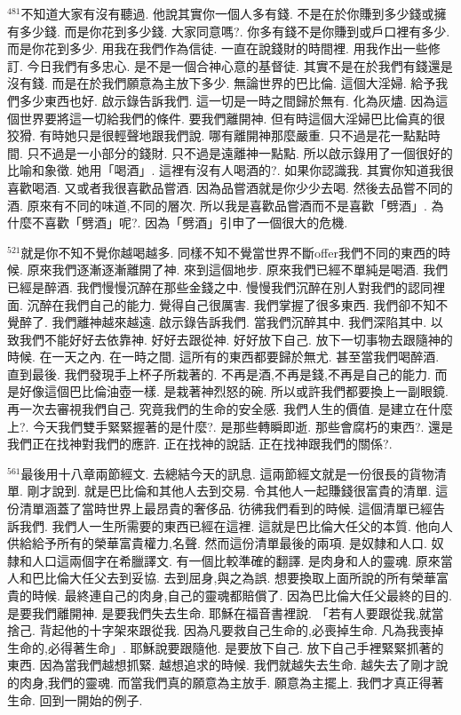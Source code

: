 \documentclass{book}
\begin{document}
$^{481}$不知道大家有沒有聽過.
他說其實你一個人多有錢.
不是在於你賺到多少錢或擁有多少錢.
而是你花到多少錢.
大家同意嗎?.
你多有錢不是你賺到或戶口裡有多少.
而是你花到多少.
用我在我們作為信徒.
一直在說錢財的時間裡.
用我作出一些修訂.
今日我們有多忠心.
是不是一個合神心意的基督徒.
其實不是在於我們有錢還是沒有錢.
而是在於我們願意為主放下多少.
無論世界的巴比倫.
這個大淫婦.
給予我們多少東西也好.
啟示錄告訴我們.
這一切是一時之間歸於無有.
化為灰燼.
因為這個世界要將這一切給我們的條件.
要我們離開神.
但有時這個大淫婦巴比倫真的很狡猾.
有時她只是很輕聲地跟我們說.
哪有離開神那麼嚴重.
只不過是花一點點時間.
只不過是一小部分的錢財.
只不過是遠離神一點點.
所以啟示錄用了一個很好的比喻和象徵.
她用「喝酒」.
這裡有沒有人喝酒的?.
如果你認識我.
其實你知道我很喜歡喝酒.
又或者我很喜歡品嘗酒.
因為品嘗酒就是你少少去喝.
然後去品嘗不同的酒.
原來有不同的味道,不同的層次.
所以我是喜歡品嘗酒而不是喜歡「劈酒」.
為什麼不喜歡「劈酒」呢?.
因為「劈酒」引申了一個很大的危機.

$^{521}$就是你不知不覺你越喝越多.
同樣不知不覺當世界不斷offer我們不同的東西的時候.
原來我們逐漸逐漸離開了神.
來到這個地步.
原來我們已經不單純是喝酒.
我們已經是醉酒.
我們慢慢沉醉在那些金錢之中.
慢慢我們沉醉在別人對我們的認同裡面.
沉醉在我們自己的能力.
覺得自己很厲害.
我們掌握了很多東西.
我們卻不知不覺醉了.
我們離神越來越遠.
啟示錄告訴我們.
當我們沉醉其中.
我們深陷其中.
以致我們不能好好去依靠神.
好好去跟從神.
好好放下自己.
放下一切事物去跟隨神的時候.
在一天之內.
在一時之間.
這所有的東西都要歸於無尤.
甚至當我們喝醉酒.
直到最後.
我們發現手上杯子所栽著的.
不再是酒,不再是錢,不再是自己的能力.
而是好像這個巴比倫油壺一樣.
是栽著神烈怒的碗.
所以或許我們都要換上一副眼鏡.
再一次去審視我們自己.
究竟我們的生命的安全感.
我們人生的價值.
是建立在什麼上?.
今天我們雙手緊緊握著的是什麼?.
是那些轉瞬即逝.
那些會腐朽的東西?.
還是我們正在找神對我們的應許.
正在找神的說話.
正在找神跟我們的關係?.

$^{561}$最後用十八章兩節經文.
去總結今天的訊息.
這兩節經文就是一份很長的貨物清單.
剛才說到.
就是巴比倫和其他人去到交易.
令其他人一起賺錢很富貴的清單.
這份清單涵蓋了當時世界上最昂貴的奢侈品.
彷彿我們看到的時候.
這個清單已經告訴我們.
我們人一生所需要的東西已經在這裡.
這就是巴比倫大任父的本質.
他向人供給給予所有的榮華富貴權力,名聲.
然而這份清單最後的兩項.
是奴隸和人口.
奴隸和人口這兩個字在希臘譯文.
有一個比較準確的翻譯.
是肉身和人的靈魂.
原來當人和巴比倫大任父去到妥協.
去到屈身,與之為誤.
想要換取上面所說的所有榮華富貴的時候.
最終連自己的肉身,自己的靈魂都賠償了.
因為巴比倫大任父最終的目的.
是要我們離開神.
是要我們失去生命.
耶穌在福音書裡說.
「若有人要跟從我,就當捨己.
背起他的十字架來跟從我.
因為凡要救自己生命的,必喪掉生命.
凡為我喪掉生命的,必得著生命」.
耶穌說要跟隨他.
是要放下自己.
放下自己手裡緊緊抓著的東西.
因為當我們越想抓緊.
越想追求的時候.
我們就越失去生命.
越失去了剛才說的肉身,我們的靈魂.
而當我們真的願意為主放手.
願意為主擺上.
我們才真正得著生命.
回到一開始的例子.
\end{document}
